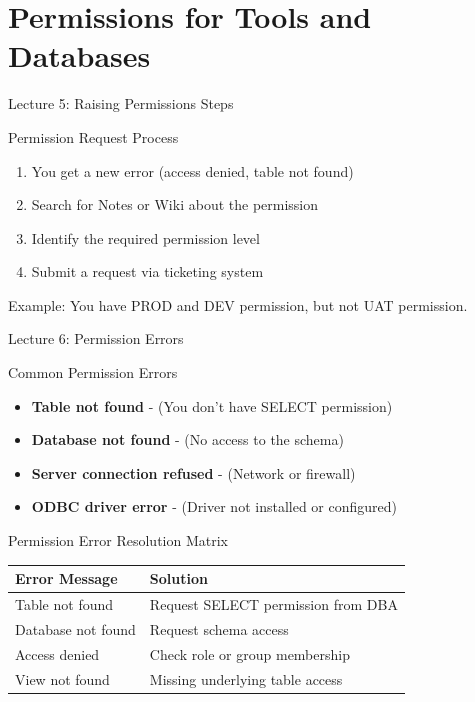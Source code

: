 \documentclass{beamer}
\begin{document}
	\section{Permissions for Tools and Databases}
	
	\begin{frame}{Lecture 5: Raising Permissions Steps}
		\begin{block}{Permission Request Process}
			\begin{enumerate}
				\item You get a new error (access denied, table not found)
				\item Search for Notes or Wiki about the permission
				\item Identify the required permission level
				\item Submit a request via ticketing system
			\end{enumerate}
		\end{block}
		\begin{example}
			Example: You have PROD and DEV permission, but not UAT permission.
		\end{example}
	\end{frame}
	
	\begin{frame}{Lecture 6: Permission Errors}
		\begin{alertblock}{Common Permission Errors}
			\begin{itemize}
				\item \textbf{Table not found} - (You don't have SELECT permission)
				\item \textbf{Database not found} - (No access to the schema)
				\item \textbf{Server connection refused} - (Network or firewall)
				\item \textbf{ODBC driver error} - (Driver not installed or configured)
			\end{itemize}
		\end{alertblock}
	\end{frame}
	
	\begin{frame}{Permission Error Resolution Matrix}
		\begin{table}
			\small
			\begin{tabular}{|p{}|p{}|}
				\hline
				\textbf{Error Message} & \textbf{Solution} \\
				\hline
				Table not found & Request SELECT permission from DBA \\
				\hline
				Database not found & Request schema access \\
				\hline
				Access denied & Check role or group membership \\
				\hline
				View not found & Missing underlying table access \\
				\hline
			\end{tabular}
		\end{table}
	\end{frame}
	
\end{document}
